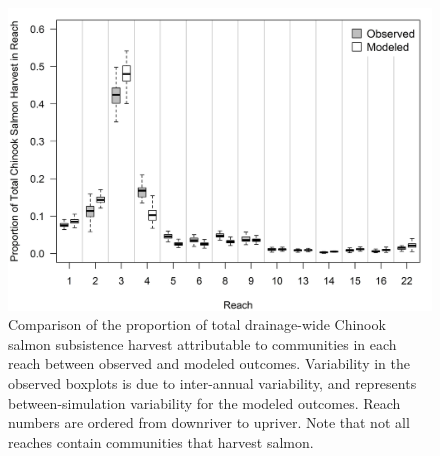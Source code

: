 \documentclass[12pt,]{book}
\theoremstyle{definition}
\theoremstyle{definition}
\theoremstyle{definition}
\theoremstyle{remark}
\begin{document}
\clearpage

\begin{figure}
  \centering
  \includegraphics{img/Ch3/FigureB3.jpg}
  \caption{Comparison of the proportion of total drainage-wide Chinook salmon subsistence harvest attributable to communities in each reach between observed and modeled outcomes. Variability in the observed boxplots is due to inter-annual variability, and represents between-simulation variability for the modeled outcomes. Reach numbers are ordered from downriver to upriver. Note that not all reaches contain communities that harvest salmon.}
  \label{fig:spatial-harvest}
\end{figure}


\end{document}
